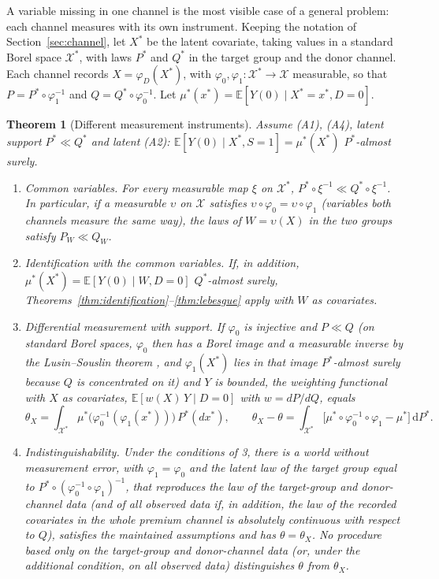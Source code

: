 \documentclass[11pt,a4paper]{article}
\newcommand{\E}{\mathbb{E}}
\newcommand{\X}{\mathcal{X}}
\newcommand{\dd}{\,\mathrm{d}}
\theoremstyle{plain}
\newtheorem{theorem}{Theorem}
\theoremstyle{definition}
\begin{document}
A variable missing in one channel is the most visible case of a general problem: each channel measures with its own instrument. Keeping the notation of Section~\ref{sec:channel}, let $X^*$ be the latent covariate, taking values in a standard Borel space $\X^*$, with laws $P^*$ and $Q^*$ in the target group and the donor channel. Each channel records $X=\varphi_D(X^*)$, with $\varphi_0,\varphi_1\colon\X^*\to\X$ measurable, so that $P=P^*\circ\varphi_1^{-1}$ and $Q=Q^*\circ\varphi_0^{-1}$. Let $\mu^*(x^*)=\E[Y(0)\mid X^*=x^*,D=0]$.

\begin{theorem}[Different measurement instruments]\label{thm:measurement}
Assume (A1), (A4), latent support $P^*\ll Q^*$ and latent (A2): $\E[Y(0)\mid X^*,S=1]=\mu^*(X^*)$ $P^*$-almost surely.
\begin{enumerate}
  \item \emph{Common variables.} For every measurable map $\xi$ on $\X^*$, $P^*\circ\xi^{-1}\ll Q^*\circ\xi^{-1}$. In particular, if a measurable $\upsilon$ on $\X$ satisfies $\upsilon\circ\varphi_0=\upsilon\circ\varphi_1$ (variables both channels measure the same way), the laws of $W=\upsilon(X)$ in the two groups satisfy $P_W\ll Q_W$.
  \item \emph{Identification with the common variables.} If, in addition, $\mu^*(X^*)=\E[Y(0)\mid W,D=0]$ $Q^*$-almost surely, Theorems~\ref{thm:identification}--\ref{thm:lebesgue} apply with $W$ as covariates.
  \item \emph{Differential measurement with support.} If $\varphi_0$ is injective and $P\ll Q$ (on standard Borel spaces, $\varphi_0$ then has a Borel image and a measurable inverse by the Lusin--Souslin theorem \citep[Corollary 15.2]{kechris1995}, and $\varphi_1(X^*)$ lies in that image $P^*$-almost surely because $Q$ is concentrated on it) and $Y$ is bounded, the weighting functional with $X$ as covariates, $\E[w(X)\,Y\mid D=0]$ with $w=dP/dQ$, equals
  \[
  \theta_X=\int_{\X^*}\mu^*\bigl(\varphi_0^{-1}(\varphi_1(x^*))\bigr)\,P^*(dx^*),\qquad
  \theta_X-\theta=\int_{\X^*}\bigl[\mu^*\circ\varphi_0^{-1}\circ\varphi_1-\mu^*\bigr]\dd P^*.
  \]
  \item \emph{Indistinguishability.} Under the conditions of 3, there is a world without measurement error, with $\varphi_1=\varphi_0$ and the latent law of the target group equal to $P^*\circ(\varphi_0^{-1}\circ\varphi_1)^{-1}$, that reproduces the law of the target-group and donor-channel data (and of all observed data if, in addition, the law of the recorded covariates in the whole premium channel is absolutely continuous with respect to $Q$), satisfies the maintained assumptions and has $\theta=\theta_X$. No procedure based only on the target-group and donor-channel data (or, under the additional condition, on all observed data) distinguishes $\theta$ from $\theta_X$.
\end{enumerate}
\end{theorem}
\end{document}
